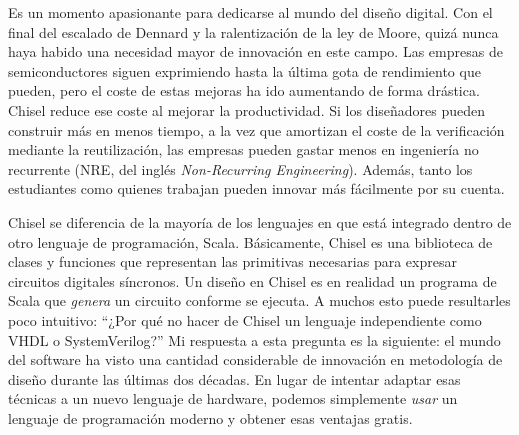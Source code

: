 \documentclass[%
    10pt,
    headinclude, footinclude=false,
    openright, %
    notitlepage,
    cleardoublepage=empty,
    headsepline,
    numbers=noenddot,
    bibliography=totoc, index=totoc,
    ]{scrbook}
\begin{document}
\medskip
\medskip


Es un momento apasionante para dedicarse al mundo del diseño digital. Con el final del escalado de Dennard y 
la ralentización de la ley de Moore, quizá nunca haya habido una necesidad mayor de innovación en este campo. 
Las empresas de semiconductores siguen exprimiendo hasta la última gota de rendimiento que pueden, pero el coste 
de estas mejoras ha ido aumentando de forma drástica. Chisel reduce ese coste al mejorar la productividad. Si los 
diseñadores pueden construir más en menos tiempo, a la vez que amortizan el coste de la verificación mediante la 
reutilización, las empresas pueden gastar menos en ingeniería no recurrente (NRE, del inglés \textit{Non-Recurring 
Engineering}). Además, tanto los estudiantes como quienes trabajan pueden innovar más fácilmente por su cuenta.


Chisel se diferencia de la mayoría de los lenguajes en que está integrado dentro de otro lenguaje de programación, 
Scala. Básicamente, Chisel es una biblioteca de clases y funciones que representan las primitivas necesarias para 
expresar circuitos digitales síncronos. Un diseño en Chisel es en realidad un programa de Scala que \emph{genera} 
un circuito conforme se ejecuta. A muchos esto puede resultarles poco intuitivo: ``¿Por qué no hacer de Chisel un 
lenguaje independiente como VHDL o SystemVerilog?'' Mi respuesta a esta pregunta es la siguiente: el mundo del 
software ha visto una cantidad considerable de innovación en metodología de diseño durante las últimas dos décadas. 
En lugar de intentar adaptar esas técnicas a un nuevo lenguaje de hardware, podemos simplemente \emph{usar} un 
lenguaje de programación moderno y obtener esas ventajas gratis.
\end{document}
